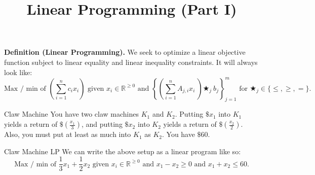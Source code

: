 \title{Linear Programming (Part I)}



\textbf{Definition (Linear Programming).} We seek to optimize a linear objective function subject to linear equality and linear inequality constraints.  It will always look like:
\[ \text{Max / min of } \left(\sum_{i = 1}^n c_i x_i\right) \text{ given } x_i \in \mathbb{R}^{\geq 0} \text{ and } \left \{ \left(\sum_{i = 1}^n A_{j, i} x_i \ \right) \bigstar_j \ b_j \right \}_{j = 1}^m \text{ for } \bigstar_j \in \{ \leq , \geq , =\}. \]

\begin{problem}{Claw Machine}
    You have two claw machines $K_1$ and $K_2$.  Putting $\$x_1$ into $K_1$ yields a return of $\$ \left(\frac{x_1}{3}\right)$, and putting $\$x_2$ into $K_2$ yields a return of $\$ \left(\frac{x_2}{2}\right)$.  Also, you must put at least as much into $K_1$ as $K_2$.  You have $\$60$.
\end{problem}

\begin{solution*}{Claw Machine LP}
    We can write the above setup as a linear program like so:
    \[ \text{Max / min of } \dfrac{1}{3}x_1 + \dfrac{1}{2}x_2 \text{ given } x_i \in \mathbb{R}^{\geq 0} \text{ and } x_1 - x_2 \geq 0 \text{ and } x_1 + x_2 \leq 60. \]
\end{solution*}

